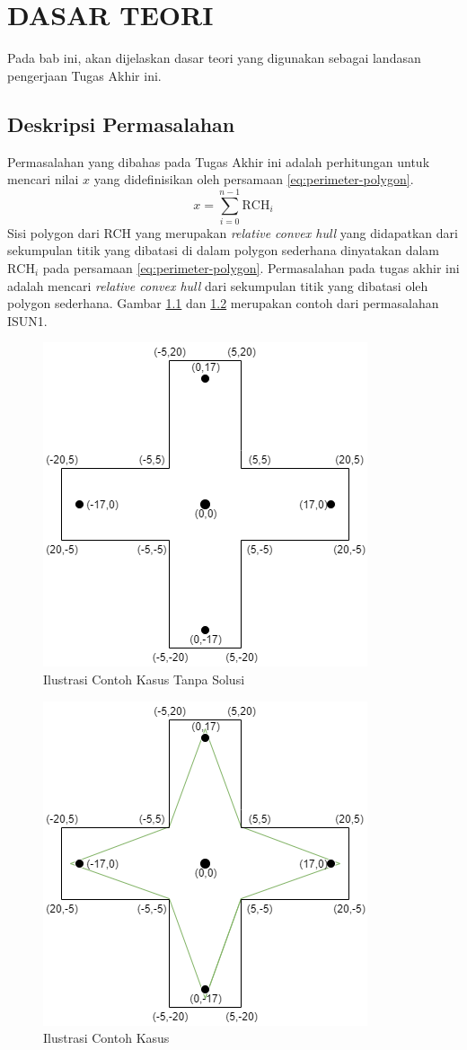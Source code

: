 \chapter {DASAR TEORI}

Pada bab ini, akan dijelaskan dasar teori yang digunakan sebagai landasan pengerjaan Tugas Akhir ini.

\section{Deskripsi Permasalahan}
Permasalahan yang dibahas pada Tugas Akhir ini adalah perhitungan untuk mencari nilai $x$ yang didefinisikan oleh persamaan \eqref{eq:perimeter-polygon}.
\begin{equation}
    \label{eq:perimeter-polygon}
    x=\sum_{i=0}^{n-1} \text{RCH}_i
\end{equation}
Sisi polygon dari RCH yang merupakan \textit{relative convex hull} yang didapatkan dari sekumpulan titik yang dibatasi di dalam polygon sederhana\cite{isun1} dinyatakan dalam $\text{RCH}_i$ pada persamaan \eqref{eq:perimeter-polygon}. Permasalahan pada tugas akhir ini adalah mencari \textit{relative convex hull} dari sekumpulan titik yang dibatasi oleh polygon sederhana. Gambar \ref{fig:ilustrasi-contoh-kasus-tanpa-solusi} dan \ref{fig:ilustrasi-contoh-kasus} merupakan contoh dari permasalahan ISUN1.
\begin{figure}[!h]
	\Centering
	\includegraphics [width=0.5\columnwidth]{bab2/img/contoh-kasus-tanpa-solusi}
	\caption {Ilustrasi Contoh Kasus Tanpa Solusi}
	\label {fig:ilustrasi-contoh-kasus-tanpa-solusi}
\end{figure}
\begin{figure}[!h]
	\Centering
	\includegraphics [width=0.5\columnwidth]{bab2/img/contoh-kasus}
	\caption {Ilustrasi Contoh Kasus}
	\label {fig:ilustrasi-contoh-kasus}
\end{figure}

